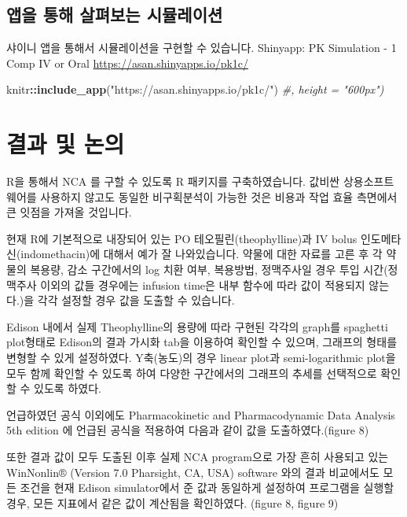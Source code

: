 \documentclass[]{krantz}
\makeatletter
\newenvironment{Shaded}{\begin{snugshade}}{\end{snugshade}}
\newcommand{\KeywordTok}[1]{\textcolor[rgb]{0.13,0.29,0.53}{\textbf{#1}}}
\newcommand{\StringTok}[1]{\textcolor[rgb]{0.31,0.60,0.02}{#1}}
\newcommand{\CommentTok}[1]{\textcolor[rgb]{0.56,0.35,0.01}{\textit{#1}}}
\newcommand{\OperatorTok}[1]{\textcolor[rgb]{0.81,0.36,0.00}{\textbf{#1}}}
\newcommand{\NormalTok}[1]{#1}
\newenvironment{kframe}{%
\medskip{}
\setlength{\fboxsep}{.8em}
 \def\at@end@of@kframe{}%
 \ifinner\ifhmode%
  \def\at@end@of@kframe{\end{minipage}}%
  \begin{minipage}{\columnwidth}%
 \fi\fi%
 \def\FrameCommand##1{\hskip\@totalleftmargin \hskip-\fboxsep
 \colorbox{shadecolor}{##1}\hskip-\fboxsep
     \hskip-\linewidth \hskip-\@totalleftmargin \hskip\columnwidth}%
 \MakeFramed {\advance\hsize-\width
   \@totalleftmargin\z@ \linewidth\hsize
   \@setminipage}}%
 {\par\unskip\endMakeFramed%
 \at@end@of@kframe}
\renewenvironment{Shaded}{\begin{kframe}}{\end{kframe}}
\theoremstyle{definition}
\theoremstyle{definition}
\theoremstyle{definition}
\theoremstyle{remark}
\makeatother
\begin{document}
\subsection{앱을 통해 살펴보는 시뮬레이션}\label{---}

샤이니 앱을 통해서 시뮬레이션을 구현할 수 있습니다. Shinyapp: PK
Simulation - 1 Comp IV or Oral \url{https://asan.shinyapps.io/pk1c/}

\begin{Shaded}
\begin{Highlighting}[]
\NormalTok{knitr}\OperatorTok{::}\KeywordTok{include_app}\NormalTok{(}\StringTok{"https://asan.shinyapps.io/pk1c/"}\NormalTok{) }\CommentTok{#, height = "600px")}
\end{Highlighting}
\end{Shaded}

\section{결과 및 논의}\label{result}

R을 통해서 NCA 를 구할 수 있도록 R 패키지를 구축하였습니다. 값비싼
상용소프트웨어를 사용하지 않고도 동일한 비구획분석이 가능한 것은 비용과
작업 효율 측면에서 큰 잇점을 가져올 것입니다.

현재 R에 기본적으로 내장되어 있는 PO 테오필린(theophylline)과 IV bolus
인도메타신(indomethacin)에 대해서 예가 잘 나와있습니다. 약물에 대한
자료를 고른 후 각 약물의 복용량, 감소 구간에서의 log 치환 여부,
복용방법, 정맥주사일 경우 투입 시간(정맥주사 이외의 값들 경우에는
infusion time은 내부 함수에 따라 값이 적용되지 않는다.)을 각각 설정할
경우 값을 도출할 수 있습니다.

Edison 내에서 실제 Theophylline의 용량에 따라 구현된 각각의 graph를
spaghetti plot형태로 Edison의 결과 가시화 tab을 이용하여 확인할 수
있으며, 그래프의 형태를 변형할 수 있게 설정하였다. Y축(농도)의 경우
linear plot과 semi-logarithmic plot을 모두 함께 확인할 수 있도록 하여
다양한 구간에서의 그래프의 추세를 선택적으로 확인할 수 있도록 하였다.

언급하였던 공식 이외에도 Pharmacokinetic and Pharmacodynamic Data
Analysis 5th edition 에 언급된 공식을 적용하여 다음과 같이 값을
도출하였다.(figure 8)

또한 결과 값이 모두 도출된 이후 실제 NCA program으로 가장 흔히 사용되고
있는 WinNonlin® (Version 7.0 Pharsight, CA, USA) software 와의 결과
비교에서도 모든 조건을 현재 Edison simulator에서 준 값과 동일하게
설정하여 프로그램을 실행할 경우, 모든 지표에서 같은 값이 계산됨을
확인하였다. (figure 8, figure 9)
\end{document}
